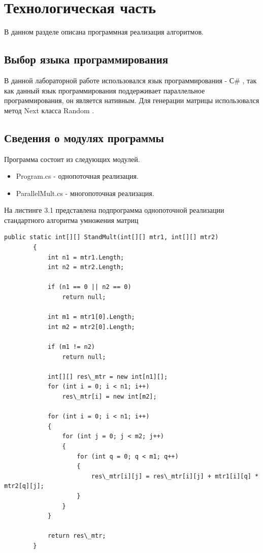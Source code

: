 \documentclass[12pt]{report}
\begin{document}
\chapter{Технологическая часть}
В данном разделе описана программная реализация алгоритмов.
\section{Выбор языка программирования}
В данной лабораторной работе использовался язык программирования - С\# \cite{C}, так как данный язык программирования поддерживает параллельное программирования, он является нативным. Для генерации матрицы использовался метод Next класса Random \cite{Rand}.

\section{Сведения о модулях программы}
Программа состоит из следующих модулей.
\begin{itemize}
	\item Program.cs - однопоточная реализация.
	\item ParallelMult.cs - многопоточная реализация.
\end{itemize}

На листинге 3.1 представлена подпрограмма однопоточной реализации стандартного алгоритма умножения матриц
\begin{lstlisting}[label=some-code,caption=Подпрограмма однопоточной реализации стандартного алгоритма умножения матриц]
public static int[][] StandMult(int[][] mtr1, int[][] mtr2)
        {
            int n1 = mtr1.Length;
            int n2 = mtr2.Length;

            if (n1 == 0 || n2 == 0)
                return null;

            int m1 = mtr1[0].Length;
            int m2 = mtr2[0].Length;

            if (m1 != n2)
                return null;

            int[][] res\_mtr = new int[n1][];
            for (int i = 0; i < n1; i++)
                res\_mtr[i] = new int[m2];

            for (int i = 0; i < n1; i++)
            {
                for (int j = 0; j < m2; j++)
                {
                    for (int q = 0; q < m1; q++)
                    {
                        res\_mtr[i][j] = res\_mtr[i][j] + mtr1[i][q] * mtr2[q][j];
                    }
                }
            }

            return res\_mtr;
        }\end{lstlisting}
\end{document}
